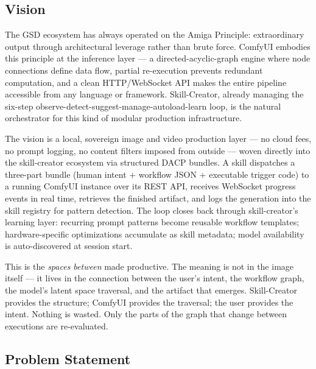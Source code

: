 \documentclass[11pt,letterpaper]{article}
\begin{document}
\subsection{Vision}

The GSD ecosystem has always operated on the Amiga Principle: extraordinary output through
architectural leverage rather than brute force. ComfyUI embodies this principle at the
inference layer --- a directed-acyclic-graph engine where node connections define data flow,
partial re-execution prevents redundant computation, and a clean HTTP/WebSocket API makes
the entire pipeline accessible from any language or framework. Skill-Creator, already managing
the six-step observe-detect-suggest-manage-autoload-learn loop, is the natural orchestrator
for this kind of modular production infrastructure.

The vision is a local, sovereign image and video production layer --- no cloud fees, no
prompt logging, no content filters imposed from outside --- woven directly into the skill-creator
ecosystem via structured DACP bundles. A skill dispatches a three-part bundle (human intent +
workflow JSON + executable trigger code) to a running ComfyUI instance over its REST API,
receives WebSocket progress events in real time, retrieves the finished artifact, and logs
the generation into the skill registry for pattern detection. The loop closes back through
skill-creator's learning layer: recurring prompt patterns become reusable workflow templates;
hardware-specific optimizations accumulate as skill metadata; model availability is
auto-discovered at session start.

This is the \emph{spaces between} made productive. The meaning is not in the image itself
--- it lives in the connection between the user's intent, the workflow graph, the model's
latent space traversal, and the artifact that emerges. Skill-Creator provides the structure;
ComfyUI provides the traversal; the user provides the intent. Nothing is wasted. Only the
parts of the graph that change between executions are re-evaluated.

\subsection{Problem Statement}
\end{document}
